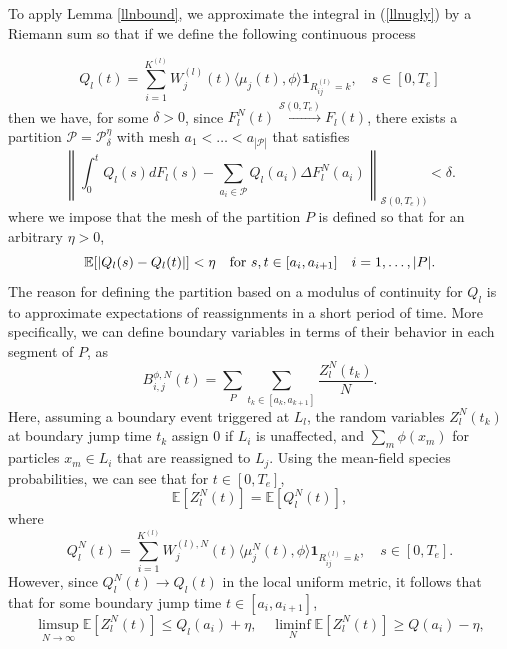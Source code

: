 To apply Lemma \ref{llnbound}, we approximate the integral in (\ref{llnugly}) by a Riemann sum so that if we define
the following continuous process 

\begin{equation}
Q_{l}(t) = \sum_{i = 1}^{K^{(l)}}W_j^{(l)}(t)\langle \mu_j(t), \phi\rangle\mathbf{1}_{R^{(l)}_{ij} = k},  \quad s \in [0,T_e] 
\end{equation}
then we have, for some $\delta>0$, since $F_l^N(t) \xrightarrow{\mathcal S(0,T_e)}F_l(t)$,  there exists a partition $\mathcal P = \mathcal P_\delta^\eta $ with mesh $a_1< \dots <a_{|\mathcal P|}$ that satisfies 
\begin{equation}
\left\| \int_0^tQ_{l}(s) dF_{l}(s)- 
\sum_{a_i \in \mathcal P}Q_{l}(a_{i})  \Delta F_{l}^N(a_{i})\right \|_{\mathcal S(0,T_e))}<\delta.
\end{equation}
where we impose that the mesh of the partition $P$ is defined so that for an arbitrary $\eta>0$,
\begin{equation}
\mathbb E[|Q_{l}(s)-Q_{l}(t)|]< \eta \quad \hbox{for } s,t \in [a_{i}, a_{i+1}] \quad i = 1, \dots,|P|.  
\end{equation}
The reason for defining the partition based on a modulus of continuity for $Q_{l}$ is to approximate expectations of reassignments in a short period of time.
More specifically, we can define boundary variables in terms of their behavior in each segment of $P$, as \begin{equation}
B_{i,j}^{\phi,N}(t) = \sum_{P} \sum_{t_k \in [a_k,a_{k+1}]} \frac{Z^N_l(t_k)}N.  \end{equation}
Here, assuming a boundary event triggered at $L_l$, the random variables $Z^N_l(t_k)$ at boundary jump time $t_k$ assign 0 if $L_i$ is unaffected, and $\sum_m\phi(x_m)$ for particles $x_m\in L_i$ that are reassigned to $L_j$.  Using the mean-field species probabilities, we can see that for $t\in [0,T_e]$,
\begin{equation}
\mathbb E[Z^N_l(t)]= \mathbb E[Q^N_l(t)],
\end{equation}
where 
\begin{equation}
Q_{l}^N(t) = \sum_{i = 1}^{K^{(l)}}W_j^{(l),N}(t)\langle \mu_j^N(t), \phi\rangle\mathbf{1}_{R^{(l)}_{ij} = k},  \quad s \in [0,T_e].
\end{equation}
However, since  $Q_l^N(t)\rightarrow Q_l(t)$ in the local uniform metric, it follows that that for some boundary jump  time $t \in [a_i,a_{i+1}]$, 
\begin{equation}
\limsup_{N\rightarrow \infty}\mathbb{E}[Z^N_l(t)] \le Q_{l}(a_i)+\eta, \quad \liminf_N \mathbb{E}[Z^N_l(t)] \ge Q(a_i)-\eta,
\end{equation}
